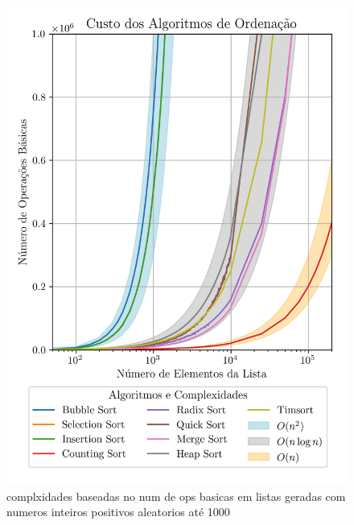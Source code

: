 \documentclass[conference]{IEEEtran}
\begin{document}
\begin{figure}[H]
    \centering
    \includegraphics[width=1\linewidth]{sorting_complexities.png}
    \caption{complxidades baseadas no num de ops basicas em listas geradas com numeros inteiros positivos aleatorios até 1000}
    \label{fig:sorting_complexities}
\end{figure}





\end{document}
